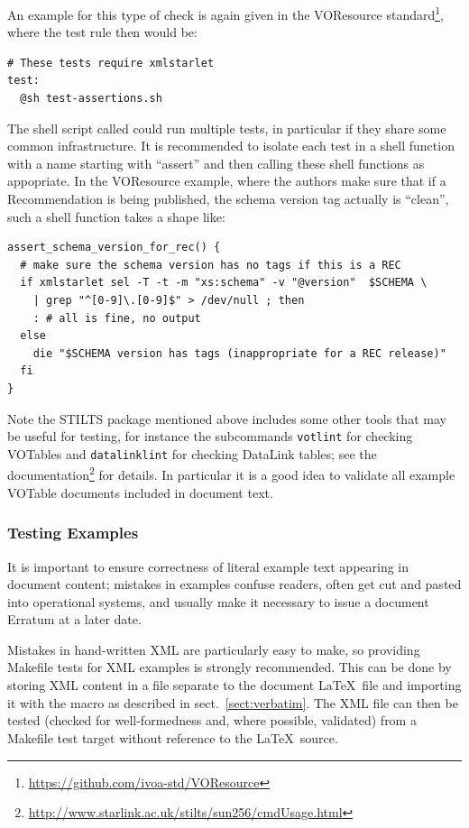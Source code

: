 \documentclass[11pt,a4paper]{ivoa}
\begin{document}
An example for this type of check is again given in the VOResource
standard\footnote{\url{https://github.com/ivoa-std/VOResource}}, where
the test rule then would be:

\begin{lstlisting}[basicstyle=\footnotesize]
# These tests require xmlstarlet
test:
  @sh test-assertions.sh
\end{lstlisting}

The shell script called could run multiple tests, in particular if they
share some common infrastructure.  It is recommended to isolate each
test in a shell function with a name starting with ``assert'' and then
calling these shell functions as appopriate.  In the VOResource example,
where the authors make sure that if a Recommendation is being published,
the schema version tag actually is ``clean'', such a shell function
takes a shape like:

\begin{lstlisting}[basicstyle=\footnotesize]
assert_schema_version_for_rec() {
  # make sure the schema version has no tags if this is a REC
  if xmlstarlet sel -T -t -m "xs:schema" -v "@version"  $SCHEMA \
    | grep "^[0-9]\.[0-9]$" > /dev/null ; then
    : # all is fine, no output
  else
    die "$SCHEMA version has tags (inappropriate for a REC release)"
  fi
}
\end{lstlisting}

Note the STILTS package mentioned above includes some other tools
that may be useful for testing, for instance the subcommands
\verb|votlint| for checking VOTables and \verb|datalinklint| for
checking DataLink tables; see the
documentation\footnote{\url{http://www.starlink.ac.uk/stilts/sun256/cmdUsage.html}}
for details.
In particular it is a good idea to validate all example VOTable documents
included in document text.

\subsubsection{Testing Examples}

It is important to ensure correctness of literal example text appearing
in document content;
mistakes in examples confuse readers,
often get cut and pasted into operational systems,
and usually make it necessary to issue a document Erratum at a later date.

Mistakes in hand-written XML are particularly easy to make,
so providing Makefile tests for XML examples is strongly recommended.
This can be done by storing XML content in a file separate to the
document \LaTeX\ file and importing it with the \verb||
macro as described in sect.~\ref{sect:verbatim}.
The XML file can then be tested (checked for well-formedness and,
where possible, validated) from a Makefile test target without reference
to the \LaTeX\ source.
\end{document}
